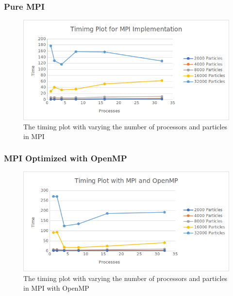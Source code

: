 \documentclass{article}
\begin{document}
\subsubsection{Pure MPI}
\begin{figure}[H]
	\begin{center}
		\hspace*{-0.5cm}                                                           
  		\includegraphics[scale=0.83]{Report_Assets/timingmpi.png}
  	\end{center}
  	\caption{The timing plot with varying the number of processors and particles in MPI}
\end{figure}

\subsubsection{MPI Optimized with OpenMP}
\begin{figure}[H]
	\begin{center}
		\hspace*{-0.5cm}                                                           
  		\includegraphics[scale=0.83]{Report_Assets/timingomp.png}
  	\end{center}
  	\caption{The timing plot with varying the number of processors and particles in MPI with OpenMP}
\end{figure}
\end{document}
